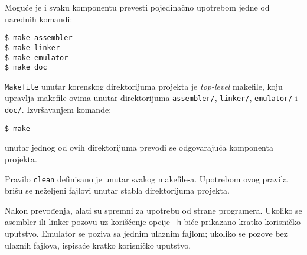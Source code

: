 Moguće je i svaku komponentu
prevesti pojedinačno upotrebom jedne od narednih komandi:
\begin{lstlisting}[frame=noline, backgroundcolor=\color{cyan}]
$ make assembler
$ make linker
$ make emulator
$ make doc
\end{lstlisting}

\texttt{Makefile} unutar korenskog direktorijuma projekta je \textit{top-level} makefile,
koju upravlja makefile-ovima unutar direktorijuma \texttt{assembler/}, \texttt{linker/},
\texttt{emulator/} i \texttt{doc/}. Izvršavanjem komande:
\begin{lstlisting}[frame=noline, backgroundcolor=\color{cyan}]
$ make
\end{lstlisting}
unutar jednog od ovih direktorijuma prevodi se odgovarajuća komponenta proje\-kta.

Pravilo \texttt{clean} definisano je unutar svakog makefile-a. Upotrebom ovog pravila
brišu se neželjeni fajlovi unutar stabla direktorijuma projekta.

Nakon prevođenja, alati su spremni za upotrebu od strane programera. Ukoliko se asembler
ili linker pozovu uz korišćenje opcije \texttt{-h} biće prikazano kratko korisničko
uputstvo. Emulator se poziva sa jednim ulaznim fajlom; ukoliko se pozove bez ulaznih
fajlova, ispisaće kratko korisničko uputstvo.

